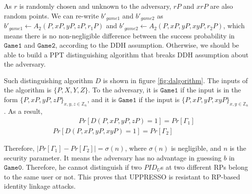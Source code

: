 As $r$ is randomly chosen and unknown to the adversary, $rP$ and $xrP$ are also random points. We can re-write $b'_{game1}$ and $b'_{game2}$ as $b'_{game1}\gets A_2(P,xP,yP,zP,r_1P)$ and $b'_{game2}\gets A_2(P,xP,yP,xyP,r_2P)$, which means there is no non-negligible difference between the success probability in $\mathtt{Game 1}$ and $\mathtt{Game 2}$, according to the DDH assumption. Otherwise, we should be able to build a PPT distinguishing algorithm that breaks DDH assumption about the adversary.

Such distinguishing algorithm $D$ is shown in figure \ref{fig:dalgorithm}.
The inputs of the algorithm is $\{P,X,Y,Z\}$. To the adversary, it is $\mathtt{Game 1}$ if the input is in the form $\{P,xP,yP,zP\}_{x,y,z \in \mathbb{Z}_n}$, and it is $\mathtt{Game 1}$ if the input is $\{P,xP,yP,xyP\}_{x,y \in \mathbb{Z}_n}$. As a result,
\vspace{-\topsep}
\begin{multline*}
   \ \ \ \ \ \ \ \ \ \ \ \ \ \ \ \ \  Pr[D(P,xP,yP,zP)=1]=Pr[{\Gamma_1}]\\
   Pr[D(P,xP,yP,xyP)=1]=Pr[{\Gamma_2}]\ \ \ \ \ \ \ \ \ \ \ \ \ \ \ \ \ \
\end{multline*}

\vspace{-\topsep}
Therefore, $|Pr[\Gamma_1]-Pr[\Gamma_2]|=\sigma(n)$, where $\sigma(n)$ is negligible, and $n$ is the security parameter. It means the adversary has no advantage in guessing $b$ in $\mathtt{Game 0}$. Therefore, he cannot distinguish if two $PID_U$s at two different RPs belong to the same user or not. This proves that UPPRESSO is resistant to RP-based identity linkage attacks.

